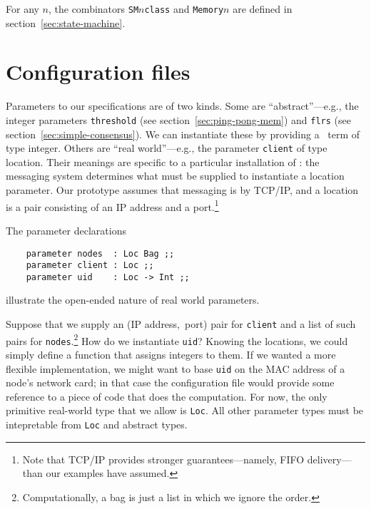 \documentclass[final]{article}
\begin{document}

For any $n$, the combinators \lstinline{SM}$n$\lstinline{class} and
\lstinline{Memory}$n$ are defined in section~\ref{sec:state-machine}.


\section{Configuration files}
\label{sec:configuration}

Parameters to our specifications are of two kinds.  Some are
``abstract''---e.g., the integer parameters \lstinline{threshold} (see
section~\ref{sec:ping-pong-mem}) and \lstinline{flrs} (see
section~\ref{sec:simple-consensus}).  We can instantiate these by
providing a \nuprl\ term of type integer.  Others are ``real
world''---e.g., the parameter \lstinline{client} of type location.
Their meanings are specific to a particular installation of \eml: the
messaging system determines what must be supplied to instantiate a
location parameter.  Our prototype assumes that messaging is by
TCP/IP, and a location is a pair consisting of an IP address and a
port.\footnote{Note that TCP/IP provides stronger guarantees---namely,
  FIFO delivery---than our examples have assumed.}

The parameter declarations
\begin{lstlisting}
    parameter nodes  : Loc Bag ;;
    parameter client : Loc ;;
    parameter uid    : Loc -> Int ;;
\end{lstlisting}
illustrate the open-ended nature of real world parameters.

Suppose that we supply an (IP address,~port) pair for
\lstinline{client} and a list of such pairs for
\lstinline{nodes}.\footnote{Computationally, a bag is just a list in
  which we ignore the order.}  How do we instantiate \lstinline{uid}?
Knowing the locations, we could simply define a function that assigns
integers to them.  If we wanted a more flexible implementation, we
might want to base \lstinline{uid} on the MAC address of a node's
network card; in that case the configuration file would provide some
reference to a piece of code that does the computation.  For now, the
only primitive real-world type that we allow is \lstinline{Loc}.  All
other parameter types must be intepretable from \lstinline{Loc} and
abstract types.
\end{document}
